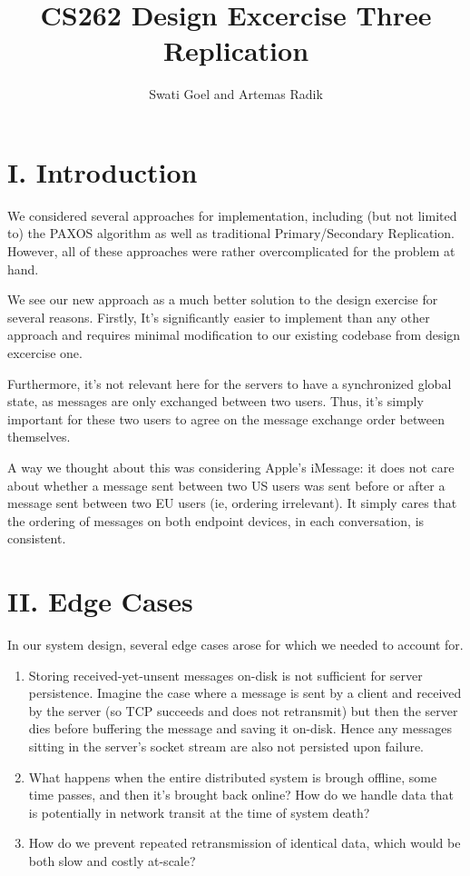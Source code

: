 \documentclass[
	a4paper, %
	10pt, %
	unnumberedsections, %
	twoside, %
]{LTJournalArticle}
\title{CS262 Design Excercise Three \\ Replication} %
\author{%
	Swati Goel and Artemas Radik
}
\begin{document}
\maketitle %


\section{I. Introduction}

We considered several approaches for implementation, including (but not limited to) the PAXOS algorithm as well as traditional Primary/Secondary Replication. However, all of these approaches were rather overcomplicated for the problem at hand.

\smallskip
We see our new approach as a much better solution to the design exercise for several reasons. Firstly, It's significantly easier to implement than any other approach and requires minimal modification to our existing codebase from design excercise one.

\smallskip
Furthermore, it's not relevant here for the servers to have a synchronized global state, as messages are only exchanged between two users. Thus, it's simply important for these two users to agree on the message exchange order between themselves. 

\smallskip
A way we thought about this was considering Apple's iMessage: it does not care about whether a message sent between two US users was sent before or after a message sent between two EU users (ie, ordering irrelevant). It simply cares that the ordering of messages on both endpoint devices, in each conversation, is consistent.


\section{II. Edge Cases}
In our system design, several edge cases arose for which we needed to account for.
\begin{enumerate}
	\item Storing received-yet-unsent messages on-disk is not sufficient for server persistence. Imagine the case where a message is sent by a client and received by the server (so TCP succeeds and does not retransmit) but then the server dies before buffering the message and saving it on-disk. Hence any messages sitting in the server's socket stream are also not persisted upon failure.
	\item What happens when the entire distributed system is brough offline, some time passes, and then it's brought back online? How do we handle data that is potentially in network transit at the time of system death?
	\item How do we prevent repeated retransmission of identical data, which would be both slow and costly at-scale?
\end{enumerate}
\end{document}
